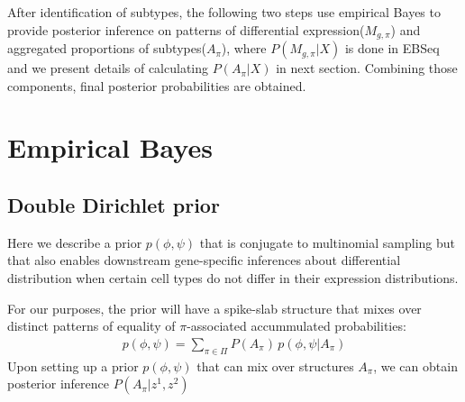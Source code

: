 \documentclass[11pt]{amsart}
\begin{document}
After identification of subtypes, the following two steps use empirical Bayes to provide posterior inference on patterns of differential expression($M_{g,\pi}$) and aggregated proportions of subtypes($A_\pi$), where $P(M_{g,\pi} | X)$ is done in EBSeq\cite{ref:Leng} and we present details of calculating $P(A_\pi | X)$ in next section. Combining those components, final posterior probabilities are obtained. 


\section{Empirical Bayes}
\subsection{Double Dirichlet prior}

Here we describe a prior $p(\phi,\psi)$ that is conjugate to multinomial
sampling but that also enables downstream gene-specific inferences about
differential distribution when certain 
cell types do not differ in their expression
distributions.  


For our purposes, the prior will have a spike-slab structure that mixes
over distinct patterns of equality of $\pi$-associated
accummulated probabilities:
\begin{eqnarray*}
p(\phi,\psi) = \sum_{\pi \in \Pi} P(A_\pi) \, p(\phi,\psi| A_\pi )
\end{eqnarray*} 
Upon setting up a prior $p(\phi,\psi)$ that can mix over structures
$A_\pi$, we can obtain posterior inference $P(A_\pi | z^1, z^2)$
\end{document}
